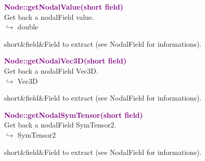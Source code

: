 
\textcolor{purple}{\textbf{Node::getNodalValue(short field)}}\label{Node::getNodalValue(short field)}\\
Get back a nodalField value.\\ \hspace*{10mm}$\hookrightarrow$ double

\begin{tcolorbox}[width=\textwidth,myArgs,tabularx={ll|R}]
short&field&Field to extract (see NodalField for informations).
\end{tcolorbox}


\textcolor{purple}{\textbf{Node::getNodalVec3D(short field)}}\label{Node::getNodalVec3D(short field)}\\
Get back a nodalField Vec3D.\\ \hspace*{10mm}$\hookrightarrow$ Vec3D

\begin{tcolorbox}[width=\textwidth,myArgs,tabularx={ll|R}]
short&field&Field to extract (see NodalField for informations).
\end{tcolorbox}



\textcolor{purple}{\textbf{Node::getNodalSymTensor(short field)}}\label{Node::getNodalSymTensor(short field)}\\
Get back a nodalField SymTensor2.\\ \hspace*{10mm}$\hookrightarrow$ SymTensor2

\begin{tcolorbox}[width=\textwidth,myArgs,tabularx={ll|R}]
short&field&Field to extract (see NodalField for informations).
\end{tcolorbox}


